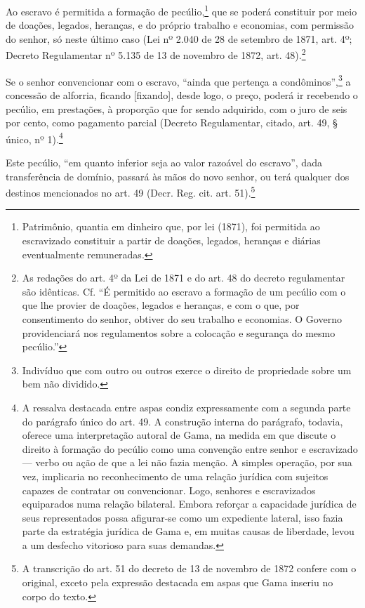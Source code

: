 Ao escravo é permitida a formação de pecúlio,\footnote{Patrimônio,
  quantia em dinheiro que, por lei (1871), foi permitida ao escravizado
  constituir a partir de doações, legados, heranças e diárias
  eventualmente remuneradas.} que se poderá constituir por meio de
doações, legados, heranças, e do próprio trabalho e economias, com
permissão do senhor, só neste último caso (Lei nº 2.040 de 28 de
setembro de 1871, art. 4º; Decreto Regulamentar nº 5.135 de
13 de novembro de 1872, art. 48).\footnote{As redações do art. 4º da
  Lei de 1871 e do art. 48 do decreto regulamentar são idênticas. Cf. ``É
  permitido ao escravo a formação de um pecúlio com o que lhe provier de
  doações, legados e heranças, e com o que, por consentimento do senhor,
  obtiver do seu trabalho e economias. O Governo providenciará nos
  regulamentos sobre a colocação e segurança do mesmo pecúlio.''}

Se o senhor convencionar com o escravo, ``ainda que pertença a
condôminos'',\footnote{Indivíduo que com outro ou outros exerce o
  direito de propriedade sobre um bem não dividido.} a concessão de
alforria, ficando {[}fixando{]}, desde logo, o preço, poderá ir
recebendo o pecúlio, em prestações, à proporção que for sendo adquirido,
com o juro de seis por cento, como pagamento parcial (Decreto
Regulamentar, citado, art. 49, § único, nº
1).\footnote{A ressalva destacada entre aspas condiz expressamente com
  a segunda parte do parágrafo único do art. 49. A construção interna do
  parágrafo, todavia, oferece uma interpretação autoral de Gama,
  na medida em que discute o direito à formação do pecúlio como uma
  convenção entre senhor e escravizado --- verbo ou ação de que a lei não
  fazia menção. A simples operação, por sua vez, implicaria no
  reconhecimento de uma relação jurídica com sujeitos capazes de
  contratar ou convencionar. Logo, senhores e escravizados equiparados
  numa relação bilateral. Embora reforçar a capacidade jurídica de seus
  representados possa afigurar-se como um expediente lateral, isso fazia
  parte da estratégia jurídica de Gama e, em muitas causas de liberdade,
  levou a um desfecho vitorioso para suas demandas.}

Este pecúlio, ``em quanto inferior seja ao valor razoável do escravo'',
dada transferência de domínio, passará às mãos do novo senhor, ou terá
qualquer dos destinos mencionados no art. 49 (Decr. Reg. cit. art.
51).\footnote{A transcrição do art. 51 do decreto de 13 de novembro de 1872
  confere com o original, exceto pela expressão destacada em aspas que
  Gama inseriu no corpo do texto.}

